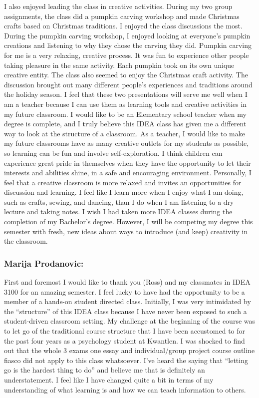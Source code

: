 \documentclass[letterpaper,10pt,headsepline]{scrreprt}
\begin{document}
I also enjoyed leading the class in creative activities. During my two group assignments, the class did a pumpkin carving workshop and made Christmas crafts based on Christmas traditions. I enjoyed the class discussions the most. During the pumpkin carving workshop, I enjoyed looking at everyone’s pumpkin creations and listening to why they chose the carving they did. Pumpkin carving for me is a very relaxing, creative process. It was fun to experience other people taking pleasure in the same activity. Each pumpkin took on its own unique creative entity. The class also seemed to enjoy the Christmas craft activity. The discussion brought out many different people’s experiences and traditions around the holiday season. I feel that these two presentations will serve me well when I am a teacher because I can use them as learning tools and creative activities in my future classroom.  
I would like to be an Elementary school teacher when my degree is complete, and I truly believe this IDEA class has given me a different way to look at the structure of a classroom. As a teacher, I would like to make my future classrooms have as many creative outlets for my students as possible, so learning can be fun and involve self-exploration. I think children can experience great pride in themselves when they have the opportunity to let their interests and abilities shine, in a safe and encouraging environment. Personally, I feel that a creative classroom is more relaxed and invites an opportunities for discussion and learning. I feel like I learn more when I enjoy what I am doing, such as crafts, sewing, and dancing, than I do when I am listening to a dry lecture and taking notes. I wish I had taken more IDEA classes during the completion of my Bachelor’s degree. However, I will be competing my degree this semester with fresh, new ideas about ways to introduce (and keep) creativity in the classroom.

\subsubsection{Marija Prodanovic:}

First and foremost I would like to thank you (Ross) and my classmates in IDEA 3100 for an amazing semester. I feel lucky to have had the opportunity to be a member of a hands-on student directed class. Initially, I was very intimidated by the “structure” of this IDEA class because I have never been exposed to such a student-driven classroom setting. My challenge at the beginning of the course was to let go of the traditional course structure that I have been accustomed to for the past four years as a psychology student at Kwantlen. I was shocked to find out that the whole 3 exams one essay and individual/group project course outline fiasco did not apply to this class whatsoever. I’ve heard the saying that “letting go is the hardest thing to do” and believe me that is definitely an understatement. I feel like I have changed quite a bit in terms of my understanding of what learning is and how we can teach information to others.
\end{document}
